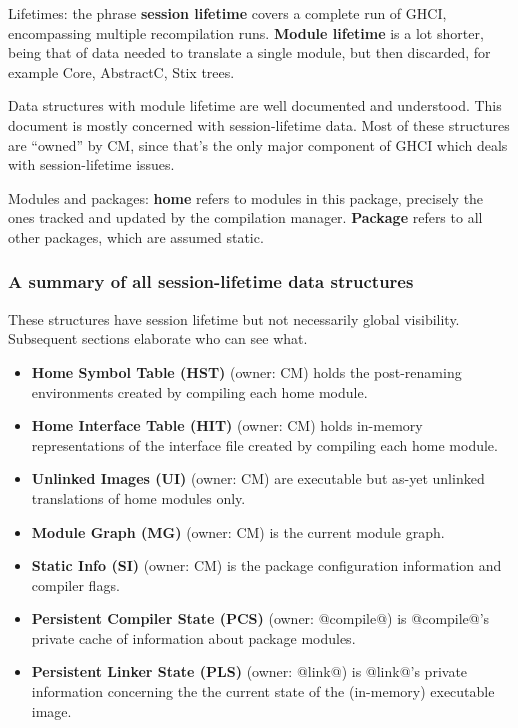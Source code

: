 \documentclass[11pt]{article}
\begin{document}
Lifetimes: the phrase {\bf session lifetime} covers a complete run of
GHCI, encompassing multiple recompilation runs.  {\bf Module lifetime}
is a lot shorter, being that of data needed to translate a single
module, but then discarded, for example Core, AbstractC, Stix trees.

Data structures with module lifetime are well documented and understood.
This document is mostly concerned with session-lifetime data.
Most of these structures are ``owned'' by CM, since that's
the only major component of GHCI which deals with session-lifetime
issues. 

Modules and packages: {\bf home} refers to modules in this package,
precisely the ones tracked and updated by the compilation manager.
{\bf Package} refers to all other packages, which are assumed static.

\subsubsection*{A summary of all session-lifetime data structures}

These structures have session lifetime but not necessarily global
visibility.  Subsequent sections elaborate who can see what.
\begin{itemize}
\item {\bf Home Symbol Table (HST)} (owner: CM) holds the post-renaming
      environments created by compiling each home module.
\item {\bf Home Interface Table (HIT)} (owner: CM) holds in-memory
      representations of the interface file created by compiling 
      each home module.
\item {\bf Unlinked Images (UI)} (owner: CM) are executable but as-yet
      unlinked translations of home modules only.
\item {\bf Module Graph (MG)} (owner: CM) is the current module graph.
\item {\bf Static Info (SI)} (owner: CM) is the package configuration
      information and compiler flags.
\item {\bf Persistent Compiler State (PCS)} (owner: @compile@)
      is @compile@'s private cache of information about package
      modules.
\item {\bf Persistent Linker State (PLS)} (owner: @link@) is
      @link@'s private information concerning the the current 
      state of the (in-memory) executable image.
\end{itemize}
\end{document}
